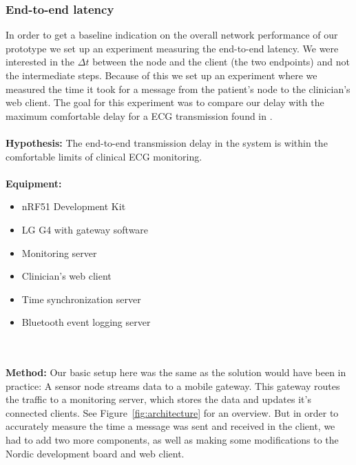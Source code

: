 
\subsubsection{End-to-end latency} %
\label{ssub:end_to_end_latency}

In order to get a baseline indication on the overall network performance of our prototype we set up an experiment measuring the end-to-end latency. We were interested in the $\Delta t$ between the node and the client (the two endpoints) and not the intermediate steps. Because of this we set up an experiment where we measured the time it took for a message from the patient's node to the clinician's web client. The goal for this experiment was to compare our delay with the maximum comfortable delay for a ECG transmission found in \cite{Alesanco:2010kc}.
\\
\\
\noindent
\textbf{Hypothesis:} The end-to-end transmission delay in the system is within the comfortable limits of clinical ECG monitoring.
\\
\\
\noindent
\textbf{Equipment:} 
\begin{itemize}

  \item nRF51 Development Kit
  
  \item LG G4 with gateway software
  
  \item Monitoring server
  
  \item Clinician's web client 
  
  \item Time synchronization server

  \item Bluetooth event logging server
  
\end{itemize}
\\
\\
\noindent
\textbf{Method:} Our basic setup here was the same as the solution would have been in practice: A sensor node streams data to a mobile gateway. This gateway routes the traffic to a monitoring server, which stores the data and updates it's connected clients. See Figure~\ref{fig:architecture} for an overview. But in order to accurately measure the time a message was sent and received in the client, we had to add two more components, as well as making some modifications to the Nordic development board and web client.

